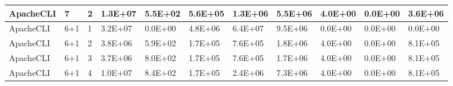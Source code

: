 \begin{table*}[]
\begin{tabular}{@{}lllllllllll@{}}
        ApacheCLI                                                & 7                                                       & 2    & 1.3E+07                                                     & 5.5E+02                                                               & 5.6E+05                                                 & 1.3E+06                                                    & 5.5E+06                                                        & 4.0E+00                                                & 0.0E+00                                                   & 3.6E+06 \\ \midrule \midrule
        ApacheCLI                                                & 6+1                                                     & 1    & 3.2E+07                                                     & 0.0E+00                                                               & 4.8E+06                                                 & 6.4E+07                                                    & 9.5E+06                                                        & 0.0E+00                                                & 0.0E+00                                                   & 0.0E+00 \\ \midrule
        ApacheCLI                                                & 6+1                                                     & 2    & 3.8E+06                                                     & 5.9E+02                                                               & 1.7E+05                                                 & 7.6E+05                                                    & 1.8E+06                                                        & 4.0E+00                                                & 0.0E+00                                                   & 8.1E+05 \\ \midrule
        ApacheCLI                                                & 6+1                                                     & 3    & 3.7E+06                                                     & 8.0E+02                                                               & 1.7E+05                                                 & 7.6E+05                                                    & 1.7E+06                                                        & 4.0E+00                                                & 0.0E+00                                                   & 8.1E+05 \\ \midrule
        ApacheCLI                                                & 6+1                                                     & 4    & 1.0E+07                                                     & 8.4E+02                                                               & 1.7E+05                                                 & 2.4E+06                                                    & 7.3E+06                                                        & 4.0E+00                                                & 0.0E+00                                                   & 8.1E+05 \\ \midrule

\end{tabular}
\end{table*}
